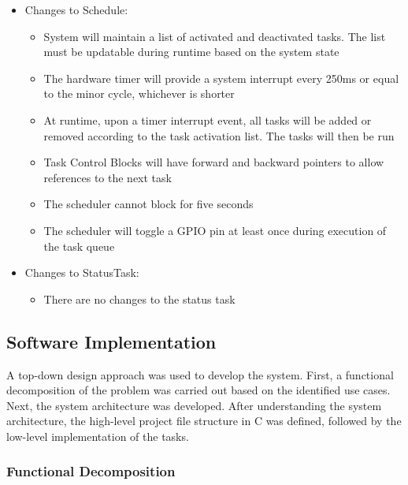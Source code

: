 \documentclass[12pt]{article} %
\begin{document}
\begin{itemize}
  \item Changes to Schedule:
    \begin{itemize}
      \item System will maintain a list of activated and deactivated tasks. The
	list must be updatable during runtime based on the system state
      \item The hardware timer will provide a system interrupt every 250ms or
	equal to the minor cycle, whichever is shorter
      \item At runtime, upon a timer interrupt event, all tasks will be added
	or removed according to the task activation list. The tasks will then
	be run
      \item Task Control Blocks will have forward and backward pointers to
	allow references to the next task
      \item The scheduler cannot block for five seconds
      \item The scheduler will toggle a GPIO pin at least once during execution
	of the task queue 
    \end{itemize}

  \item Changes to StatusTask:
    \begin{itemize}
      \item There are no changes to the status task
    \end{itemize}
\end{itemize}

    \subsection{Software Implementation}

    A top-down design approach was used to develop the system. First, a functional
    decomposition of the problem was carried out based on the identified use cases.
    Next, the system architecture was developed. After understanding the system
    architecture, the high-level project file structure in C was defined, followed
    by the low-level implementation of the tasks.

    \subsubsection{Functional Decomposition}

\end{document}
